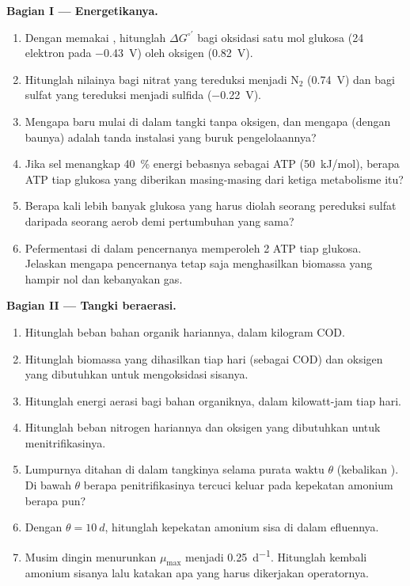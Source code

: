 \begin{problem}
\medskip
\noindent\textbf{Bagian I --- Energetikanya.}
\begin{enumerate}
  \item Dengan memakai , hitunglah $\Delta G^{\circ\prime}$
        bagi oksidasi satu mol glukosa (24 elektron pada
        \qty{-0.43}{V}) oleh oksigen (\qty{+0.82}{V}).
  \item Hitunglah nilainya bagi nitrat yang tereduksi menjadi $\mathrm{N_2}$
        (\qty{+0.74}{V}) dan bagi sulfat yang tereduksi menjadi sulfida
        (\qty{-0.22}{V}).
  \item Mengapa  baru mulai di dalam tangki tanpa oksigen, dan
        mengapa  (dengan baunya) adalah tanda instalasi
        yang buruk pengelolaannya?
  \item Jika sel menangkap \qty{40}{\%} energi bebasnya sebagai ATP
        (\qty{50}{kJ/mol}), berapa ATP tiap glukosa yang diberikan
        masing-masing dari ketiga metabolisme itu?
  \item Berapa kali lebih banyak glukosa yang harus diolah seorang
        pereduksi sulfat daripada seorang aerob demi pertumbuhan yang sama?
  \item Pefermentasi di dalam pencernanya memperoleh 2 ATP tiap glukosa.
        Jelaskan mengapa pencernanya tetap saja menghasilkan biomassa
        yang hampir nol dan kebanyakan gas.
\end{enumerate}

\medskip
\noindent\textbf{Bagian II --- Tangki beraerasi.}
\begin{enumerate}[resume]
  \item Hitunglah beban bahan organik hariannya, dalam kilogram COD.
  \item Hitunglah biomassa yang dihasilkan tiap hari (sebagai COD) dan
        oksigen yang dibutuhkan untuk mengoksidasi sisanya.
  \item Hitunglah energi aerasi bagi bahan organiknya, dalam
        kilowatt-jam tiap hari.
  \item Hitunglah beban nitrogen hariannya dan oksigen yang dibutuhkan
        untuk menitrifikasinya.
  \item Lumpurnya ditahan di dalam tangkinya selama purata waktu $\theta$
        (kebalikan ). Di bawah $\theta$ berapa
        penitrifikasinya tercuci keluar pada kepekatan amonium berapa pun?
  \item Dengan $\theta = \qty{10}{d}$, hitunglah kepekatan amonium sisa
        di dalam efluennya.
  \item Musim dingin menurunkan $\mu_{\max}$ menjadi \qty{0.25}{d^{-1}}.
        Hitunglah kembali amonium sisanya lalu katakan apa yang harus
        dikerjakan operatornya.
\end{enumerate}


\end{problem}
